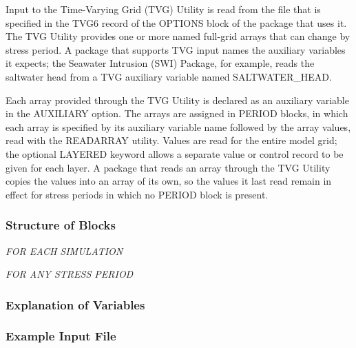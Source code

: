 Input to the Time-Varying Grid (TVG) Utility is read from the file that is specified in the TVG6 record of the OPTIONS block of the package that uses it.  The TVG Utility provides one or more named full-grid arrays that can change by stress period.  A package that supports TVG input names the auxiliary variables it expects; the Seawater Intrusion (SWI) Package, for example, reads the saltwater head from a TVG auxiliary variable named SALTWATER\_HEAD.

Each array provided through the TVG Utility is declared as an auxiliary variable in the AUXILIARY option.  The arrays are assigned in PERIOD blocks, in which each array is specified by its auxiliary variable name followed by the array values, read with the READARRAY utility.  Values are read for the entire model grid; the optional LAYERED keyword allows a separate value or control record to be given for each layer.  A package that reads an array through the TVG Utility copies the values into an array of its own, so the values it last read remain in effect for stress periods in which no PERIOD block is present.

\vspace{5mm}
\subsubsection{Structure of Blocks}
\vspace{5mm}

\noindent \textit{FOR EACH SIMULATION}

\vspace{5mm}
\noindent \textit{FOR ANY STRESS PERIOD}


\vspace{5mm}
\subsubsection{Explanation of Variables}
\begin{description}

\end{description}

\vspace{5mm}
\subsubsection{Example Input File}

